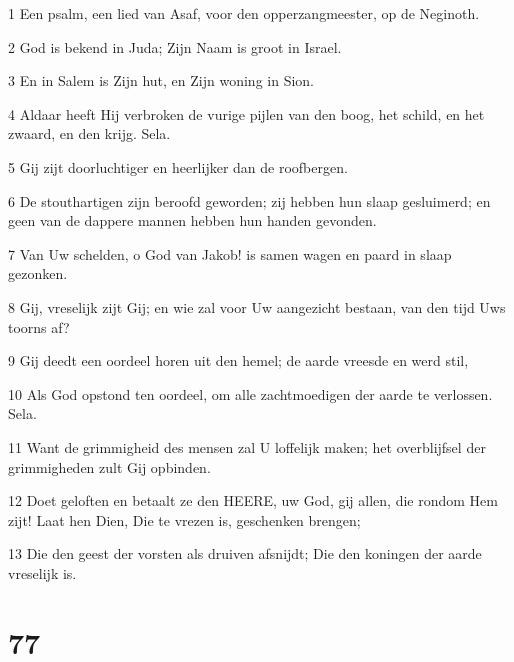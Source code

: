 \par 1 Een psalm, een lied van Asaf, voor den opperzangmeester, op de Neginoth.
\par 2 God is bekend in Juda; Zijn Naam is groot in Israel.
\par 3 En in Salem is Zijn hut, en Zijn woning in Sion.
\par 4 Aldaar heeft Hij verbroken de vurige pijlen van den boog, het schild, en het zwaard, en den krijg. Sela.
\par 5 Gij zijt doorluchtiger en heerlijker dan de roofbergen.
\par 6 De stouthartigen zijn beroofd geworden; zij hebben hun slaap gesluimerd; en geen van de dappere mannen hebben hun handen gevonden.
\par 7 Van Uw schelden, o God van Jakob! is samen wagen en paard in slaap gezonken.
\par 8 Gij, vreselijk zijt Gij; en wie zal voor Uw aangezicht bestaan, van den tijd Uws toorns af?
\par 9 Gij deedt een oordeel horen uit den hemel; de aarde vreesde en werd stil,
\par 10 Als God opstond ten oordeel, om alle zachtmoedigen der aarde te verlossen. Sela.
\par 11 Want de grimmigheid des mensen zal U loffelijk maken; het overblijfsel der grimmigheden zult Gij opbinden.
\par 12 Doet geloften en betaalt ze den HEERE, uw God, gij allen, die rondom Hem zijt! Laat hen Dien, Die te vrezen is, geschenken brengen;
\par 13 Die den geest der vorsten als druiven afsnijdt; Die den koningen der aarde vreselijk is.

\chapter{77}

